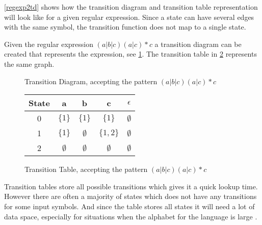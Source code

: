\cref{regexp2td} shows how the transition diagram and transition table
representation will look like for a given regular expression. Since a state can
have several edges with the same symbol, the transition function does not map to
a single state.
\newline
\begin{example} \label{regexp2td}
Given the regular expression $(a|b|c)(a|c)* c$ a transition diagram can be
created that represents the expression, see \cref{fig:td}. The transition table
in \cref{fig:tt} represents the same graph.

\begin{figure}[h!]
  \centering
  \caption{Transition Diagram, accepting the pattern $(a|b|c)(a|c)* c$
  \label{fig:td}}
\end{figure}

\begin{figure}[h!]
  \centering
  \begin{tabular}{| c | c c c c |}
    \hline
    \hline
    State & a & b & c & $\epsilon$\\
    \hline
    0 & $\{1\}$ & $\{1\}$ & $\{1\}$ & $\emptyset$ \\
    1 & $\{1\}$ & $\emptyset$ & $\{1,2\}$ & $\emptyset$ \\
    2 & $\emptyset$ & $\emptyset$ & $\emptyset$ & $\emptyset$ \\
    \hline
  \end{tabular}
  \caption{Transition Table, accepting the pattern $(a|b|c)(a|c)* c$
  \label{fig:tt}}
\end{figure}
\end{example}

Transition tables store all possible transitions which gives it a quick lookup
time. However there are often a majority of states which does not have any
transitions for some input symbols. And since the table stores all states it
will need a lot of data space, especially for situations when the alphabet for
the language is large \cite{Aho2006}.

